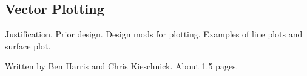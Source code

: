 \subsection*{Vector Plotting}

Justification. Prior design. Design mods for plotting. Examples of line plots and surface plot.

Written by Ben Harris and Chris Kieschnick. About 1.5 pages.

